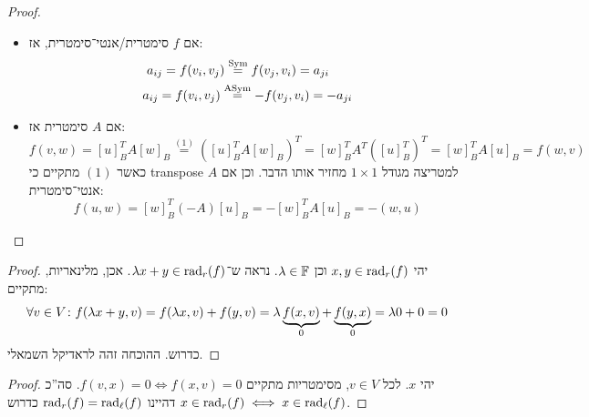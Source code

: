 \documentclass[name=רשימות אלגברה לינארית 2א]{../../../tex/classes/megasumPreamble}
\begin{document}
	
	\begin{proof}\,
		\begin{itemize}
			\item[$\implies$] אם $f$ סימטרית/אנטי־סימטרית, אז: 
			\begin{align*}
				a_{ij} = f(v_i, v_j) &\overset{\operatorname{Sym}}{=} f(v_j, v_i) = a_{ji} \\
				a_{ij} = f(v_i, v_j) \,\,&\!\!\overset{\operatorname{ASym}}{=} -f(v_j, v_i) = -a_{ji}
			\end{align*}
			\item[$\impliedby$] אם $A$ סימטרית אז: 
			\[ f(v, w) = [u]_B^TA[w]_B \overset{(1)}{=} ([u]_B^TA[w]_B)^T = [w]_B^TA^T([u]_B^T)^T = [w]^T_BA[u]_B = f(w, v) \]
			כאשר $(1)$ מתקיים כי transpose למטריצה מגודל $1 \times 1$ מחזיר אותו הדבר. וכן אם $A$ אנטי־סימטרית:
			\[ f(u, w) = [w]^T_B(-A)[u]_B = -[w]_B^TA[u]_B = -(w, u) \]\mathenvendproof
		\end{itemize}
	\end{proof}
	\begin{proof}
		יהי $x, y \in \operatorname{rad}_r(f)$ וכן $\lambda \in \mathbb{F}$. נראה ש־$\lambda x + y \in \operatorname{rad}_r(f)$. אכן, מלינאריות, מתקיים: 
		\[ \forall v \in V \colon f(\lambda x + y, v) = f(\lambda x, v) + f(y, v) = \lambda \underbrace{f(x, v)}_{0} + \underbrace{f(y, x)}_{0} = \lambda 0 + 0 = 0 \]
		כדרוש. ההוכחה זהה לראדיקל השמאלי. 
	\end{proof}
	
	\begin{proof}
		יהי $x$. לכל $v \in V$, מסימטריות מתקיים $f(v, x) = 0 \iff f(x, v) = 0$. סה''כ $x \in \operatorname{rad}_r(f) \iff x \in \operatorname{rad}_\ell(f)$ דהיינו $\operatorname{rad}_r(f) = \operatorname{rad}_\ell(f)$ כדרוש. 
	\end{proof}
	
\end{document}
